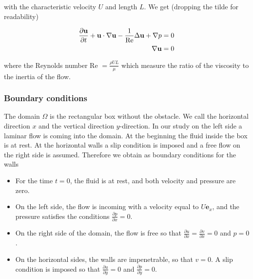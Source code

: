 with the characteristic velocity $U$ and length $L$. We get (dropping the tilde for readability)

\begin{align}
    \frac{\partial \textbf{u}}{\partial t} + \textbf{u} \cdot \nabla \textbf{u} - \frac{1}{\text{Re}} \Delta \textbf{u} + \nabla p = 0 \\
    \nabla \textbf{u} = 0 \notag
\end{align}

where the Reynolds number Re $= \frac{\rho U L}{\mu}$ which measure the ratio of the viscosity to the inertia of the flow. \\

\subsubsection{Boundary conditions}
The domain $\Omega$ is the rectangular box without the obstacle. We call the horizontal direction $x$ and the vertical direction $y$-direction. In our study on the left side a laminar flow is coming into the domain. At the beginning the fluid inside the box is at rest. At the horizontal walls a slip condition is imposed and a free flow on the right side is assumed. Therefore we obtain as boundary conditions for the walls

\begin{itemize}
    \item For the time $t=0$, the fluid is at rest, and both velocity and pressure are zero.
    \item On the left side, the flow is incoming with a velocity equal to $U \mathbf{e}_x$, and the pressure satisfies the conditions $\frac{\partial p}{\partial x} = 0$.
    \item On the right side of the domain, the flow is free so that $\frac{\partial u}{\partial x} = \frac{\partial v}{\partial x} = 0$ and $p = 0$.
    \item On the horizontal sides, the walls are impenetrable, so that $v = 0$. A slip condition is imposed so that $\frac{\partial u}{\partial y} = 0$ and $\frac{\partial p}{\partial y} = 0$.
\end{itemize}

